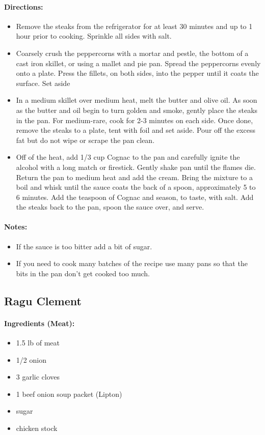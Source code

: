 \documentclass{article}
\begin{document}
\paragraph{Directions:}
\begin{itemize}
    \item Remove the steaks from the refrigerator for at least 30 minutes and up to 1 hour prior to cooking. Sprinkle all sides with salt.
    \item Coarsely crush the peppercorns with a mortar and pestle, the bottom of a cast iron skillet, or using a mallet and pie pan. Spread the peppercorns evenly onto a plate. Press the fillets, on both sides, into the pepper until it coats the surface. Set aside
    \item In a medium skillet over medium heat, melt the butter and olive oil. As soon as the butter and oil begin to turn golden and smoke, gently place the steaks in the pan. For medium-rare, cook for 2-3 minutes on each side. Once done, remove the steaks to a plate, tent with foil and set aside. Pour off the excess fat but do not wipe or scrape the pan clean.
    \item Off of the heat, add 1/3 cup Cognac to the pan and carefully ignite the alcohol with a long match or firestick. Gently shake pan until the flames die. Return the pan to medium heat and add the cream. Bring the mixture to a boil and whisk until the sauce coats the back of a spoon, approximately 5 to 6 minutes. Add the teaspoon of Cognac and season, to taste, with salt. Add the steaks back to the pan, spoon the sauce over, and serve.
\end{itemize}

\paragraph{Notes:}
\begin{itemize}
    \item If the sauce is too bitter add a bit of sugar.
    \item If you need to cook many batches of the recipe use many pans so that the bits in the pan don't get cooked too much.
\end{itemize}

\subsection{Ragu Clement} 

\paragraph{Ingredients (Meat):}
\begin{itemize}
    \item 1.5 lb of meat
    \item 1/2 onion
    \item 3 garlic cloves
    \item 1 beef onion soup packet (Lipton)
    \item sugar
    \item chicken stock
\end{itemize}  
\end{document}

